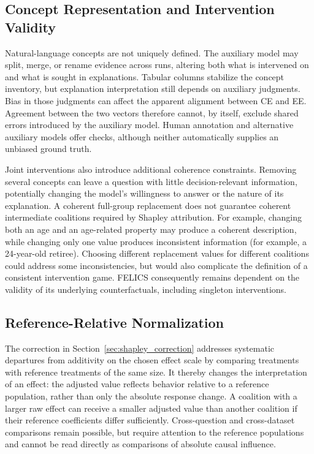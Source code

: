\subsection{Concept Representation and Intervention Validity}

Natural-language concepts are not uniquely defined. The auxiliary model may split, merge, or rename evidence across runs, altering both what is intervened on and what is sought in explanations. Tabular columns stabilize the concept inventory, but explanation interpretation still depends on auxiliary judgments. Bias in those judgments can affect the apparent alignment between CE and EE. Agreement between the two vectors therefore cannot, by itself, exclude shared errors introduced by the auxiliary model. Human annotation and alternative auxiliary models offer checks, although neither automatically supplies an unbiased ground truth.

Joint interventions also introduce additional coherence constraints. Removing several concepts can leave a question with little decision-relevant information, potentially changing the model's willingness to answer or the nature of its explanation. A coherent full-group replacement does not guarantee coherent intermediate coalitions required by Shapley attribution. For example, changing both an age and an age-related property may produce a coherent description, while changing only one value produces inconsistent information (for example, a 24-year-old retiree). Choosing different replacement values for different coalitions could address some inconsistencies, but would also complicate the definition of a consistent intervention game. FELICS consequently remains dependent on the validity of its underlying counterfactuals, including singleton interventions.

\subsection{Reference-Relative Normalization}
\label{sec:normalization_limitations}

The correction in Section~\ref{sec:shapley_correction} addresses systematic departures from additivity on the chosen effect scale by comparing treatments with reference treatments of the same size. It thereby changes the interpretation of an effect: the adjusted value reflects behavior relative to a reference population, rather than only the absolute response change. A coalition with a larger raw effect can receive a smaller adjusted value than another coalition if their reference coefficients differ sufficiently. Cross-question and cross-dataset comparisons remain possible, but require attention to the reference populations and cannot be read directly as comparisons of absolute causal influence.

